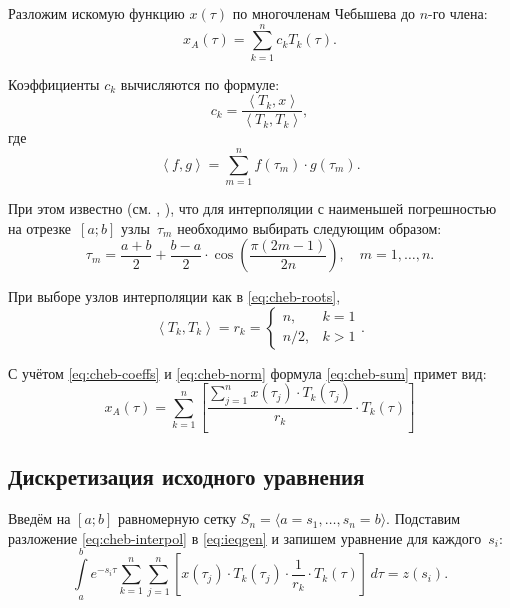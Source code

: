 \documentclass[11pt]{article}
\numberwithin{equation}{section}
\newcommand{\intl}{\int\limits}
\newcommand{\scalmult}[1]{{\left \langle #1 \right \rangle}}
\newcommand{\mul}{\cdot}
\begin{document}
Разложим искомую функцию $x(\tau)$ по многочленам Чебышева до $n$-го члена:
\begin{equation}
  \label{eq:cheb-sum}
  x_A(\tau) = \sum_{k=1}^n{c_k T_k(\tau)}.
\end{equation}

Коэффициенты $c_k$ вычисляются по формуле:
\begin{equation}
  \label{eq:cheb-coeffs}
  c_k = \frac{\scalmult{T_k, x}}{\scalmult{T_k, T_k}},
\end{equation}
где
\begin{equation}
  \scalmult{f, g} = \sum_{m=1}^n{f(\tau_m)\mul g(\tau_m)}.
\end{equation}

При этом известно (см. \cite{bahvalov01}, \cite{amosov94}), что для
интерполяции с наименьшей погрешностью на отрезке $[a;b]$ узлы $\tau_m$
необходимо выбирать следующим образом:
\begin{equation}
  \label{eq:cheb-roots}
  \tau_m = \frac{a+b}{2} +
  \frac{b-a}{2}\mul\cos\left(\frac{\pi(2m-1)}{2n}\right),\quad m = 1,\ldots,n.
\end{equation}

При выборе узлов интерполяции как в \eqref{eq:cheb-roots},
\begin{equation}
  \label{eq:cheb-norm}
  \scalmult{T_k, T_k} = r_k =
  \begin{cases}
    n,&k = 1\\
    n/2,&k>1
  \end{cases}.
\end{equation}

С учётом \eqref{eq:cheb-coeffs} и \eqref{eq:cheb-norm} формула
\eqref{eq:cheb-sum} примет вид:
\begin{equation}
  \label{eq:cheb-interpol}
  x_A(\tau) = \sum_{k=1}^n \left[
    \frac{\sum_{j=1}^n 
      x(\tau_j)\mul T_k(\tau_j)}{r_k}
    \mul T_k(\tau)
  \right]
\end{equation}

\subsection{Дискретизация исходного уравнения}
Введём на $[a; b]$ равномерную сетку $S_n = \langle a = s_1, \dotsc,
s_n = b \rangle$. Подставим разложение \eqref{eq:cheb-interpol} в
\eqref{eq:ieqgen} и запишем уравнение для каждого $s_i$:
\begin{equation}
  \label{eq:psi-matrix}
  \intl_a^b
  e^{-s_i\tau}
  \sum_{k=1}^n\sum_{j=1}^n \left[
    x(\tau_j)\mul T_k(\tau_j) \mul \frac{1}{r_k} \mul T_k(\tau)
  \right]\,d\tau = 
  z(s_i).
\end{equation}
\end{document}

